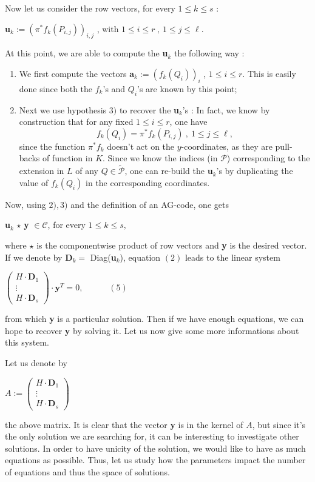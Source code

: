 \documentclass[10pt]{article}
\newcommand{\s}{\vspace{0.3cm}}
\newcommand{\cd}{\cdot}
\newcommand{\PR}{\mathcal{P}}
\begin{document}
Now let us consider the row vectors, for every $1 \leq k \leq s$ :
\begin{center}
\textbf{u}$_{k}:= \left(\pi^*f_k(P_{i,j})\right)_{i,j}$ , with $1 \leq i \leq r \ , \ 1 \leq j \leq \ell$.
\end{center}

At this point, we are able to compute the \textbf{u}$_{k}$ the following way :
\begin{enumerate}
\item We first compute the vectors \textbf{a}$_{k} := (f_k(Q_i))_i$ , $1 \leq i \leq r$. This is easily done since both the $f_k$'s and $Q_i$'s are known by this point;
\item Next we use hypothesis $3)$ to recover the \textbf{u}$_{k}$'s : In fact, we know by construction that for any fixed $1 \leq i \leq r$, one have 
\[f_k(Q_i) = \pi^*f_k(P_{i,j}) \ , \ 1 \leq j \leq \ell,\]
since the function $\pi^*f_k$ doesn't act on the $y$-coordinates, as they are pull-backs of function in $K$. Since we know the indices (in $\PR$) corresponding to the extension in $L$ of any $Q \in \tilde{\PR}$, one can re-build the \textbf{u}$_{k}$'s by duplicating the value of $f_k(Q_i)$ in the corresponding coordinates.
\end{enumerate}

Now, using $2), 3)$ and the definition of an AG-code, one gets 
\begin{center}
\textbf{u}$_{k}$ $\star$ \textbf{y} $\in \mathcal{C}$, for every $1 \leq k \leq s,$
\end{center}
where $\star$ is the componentwise product of row vectors and \textbf{y} is the desired vector.
If we denote by \textbf{D}$_{k} = $ Diag(\textbf{u}$_{k}$), equation $(2)$ leads to the linear system 
\begin{center}
$\begin{pmatrix}
H \cd \textbf{D}_1 \\
\vdots \\
H \cd \textbf{D}_s
\end{pmatrix}
\cd \textbf{y}^T = 0, \quad \quad \quad (5)$
\end{center}
from which \textbf{y} is a particular solution.
Then if we have enough equations, we can hope to recover \textbf{y} by solving it. Let us now give some more informations about this system.

\s

 Let us denote by
\begin{center}
$A := \begin{pmatrix}
H \cd \textbf{D}_1 \\
\vdots \\
H \cd \textbf{D}_s
\end{pmatrix}
$
\end{center}
the above matrix. It is clear that the vector \textbf{y} is in the kernel of $A$, but since it's the only solution we are searching for, it can be interesting to investigate other solutions. In order to have unicity of the solution, we would like to have as much equations as possible. Thus, let us study how the parameters impact the number of equations and thus the space of solutions.
\end{document}

